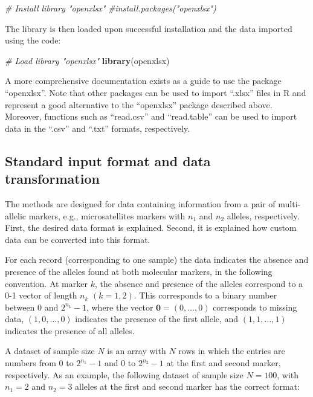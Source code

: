 \documentclass[
]{article}
\newenvironment{Shaded}{\begin{snugshade}}{\end{snugshade}}
\newcommand{\CommentTok}[1]{\textcolor[rgb]{0.56,0.35,0.01}{\textit{#1}}}
\newcommand{\FunctionTok}[1]{\textcolor[rgb]{0.13,0.29,0.53}{\textbf{#1}}}
\newcommand{\NormalTok}[1]{#1}
\begin{document}
\begin{Shaded}
\begin{Highlighting}[]
\CommentTok{\# Install library "openxlsx"}
    \CommentTok{\#install.packages("openxlsx") }
\end{Highlighting}
\end{Shaded}

The library is then loaded upon successful installation and the data
imported using the code:

\begin{Shaded}
\begin{Highlighting}[]
\CommentTok{\# Load library "openxlsx"}
\FunctionTok{library}\NormalTok{(openxlsx)}
\end{Highlighting}
\end{Shaded}

A more comprehensive documentation exists as a guide to use the package
``openxlsx''. Note that other packages can be used to import ``.xlsx''
files in R and represent a good alternative to the ``openxlsx'' package
described above. Moreover, functions such as ``read.csv'' and
``read.table'' can be used to import data in the ``.csv'' and ``.txt''
formats, respectively.

\subsection*{Standard input format and data transformation}

The methods are designed for data containing information from a pair of
multi-allelic markers, e.g., microsatellites markers with \(n_1\) and
\(n_2\) alleles, respectively. First, the desired data format is
explained. Second, it is explained how custom data can be converted into
this format.

For each record (corresponding to one sample) the data indicates the
absence and presence of the alleles found at both molecular markers, in
the following convention. At marker \(k\), the absence and presence of
the alleles correspond to a 0-1 vector of length \(n_k\) \((k=1,2)\).
This corresponds to a binary number between 0 and \(2^{n_k}-1\), where
the vector \(\pmb 0= (0,\ldots,0)\) corresponds to missing data,
\((1,0,\ldots,0)\) indicates the presence of the first allele, and
\((1,1,\ldots,1)\) indicates the presence of all alleles.

A dataset of sample size \(N\) is an array with \(N\) rows in which the
entries are numbers from 0 to \(2^{n_1}-1\) and 0 to \(2^{n_2}-1\) at
the first and second marker, respectively. As an example, the following
dataset of sample size \(N = 100\), with \(n_1 = 2\) and \(n_2 = 3\)
alleles at the first and second marker has the correct format:
\end{document}
